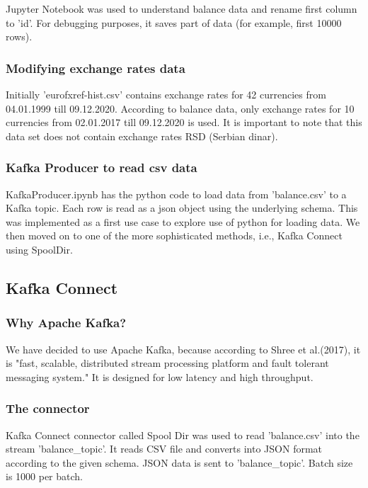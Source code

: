 \documentclass{article}
\begin{document}
Jupyter Notebook was used to understand balance data and rename first column to 'id'. For debugging purposes, it saves part of data (for example, first 10000 rows).

\subsubsection{Modifying exchange rates data}

Initially 'eurofxref-hist.csv' contains exchange rates for 42 currencies from 04.01.1999 till 09.12.2020. According to balance data, only exchange rates for 10 currencies from 02.01.2017 till 09.12.2020 is used. It is important to note that this data set does not contain exchange rates RSD (Serbian dinar).

\subsubsection{Kafka Producer to read csv data}

KafkaProducer.ipynb has the python code to load data from 'balance.csv' to a Kafka topic. Each row is read as a json object using the underlying schema. This was implemented as a first use case to explore use of python for loading data. We then moved on to one of the more sophisticated methods, i.e., Kafka Connect using SpoolDir.

\subsection{Kafka Connect}

\subsubsection{Why Apache Kafka?}

We have decided to use Apache Kafka, because according to Shree et al.(2017), it is "fast, scalable, distributed stream processing platform and fault tolerant messaging system." It is designed for low latency and high throughput\cite{shree}.

\subsubsection{The connector}
Kafka Connect connector called Spool Dir was used to read 'balance.csv' into the stream 'balance\_topic'. It reads CSV file and converts into JSON format according to the given schema. JSON data is sent to 'balance\_topic'. Batch size is 1000 per batch.
\end{document}
